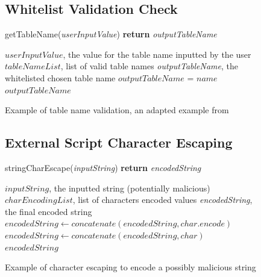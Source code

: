 \documentclass{ueacmpstyle}
\begin{document}
          \begin{figure}[ht]
            \subsection{Whitelist Validation Check}
            \label{sec:whitelist-valid}
            \centering
            \begin{algorithm}[H]
            \caption{getTableName(\emph{userInputValue}) {\bf return} \emph{outputTableName}}
              \begin{algorithmic}[1]
                \Require $userInputValue$, the value for the table name inputted by the user
                \Require $tableNameList$, list of valid table names
                \Ensure \emph{outputTableName}, the whitelisted chosen table name
                    \State $outputTableName$ = $name$
                  \EndIf
                \EndFor
                \State \Return $outputTableName$
              \end{algorithmic}
            \end{algorithm}
            \caption{Example of table name validation, an adapted example from 
                     \cite{OWASPSqlInjectionPrevention}}
            \label{fig:whitelist-valid}
          \end{figure}

          \begin{figure}[ht]
            \subsection{External Script Character Escaping}
            \label{sec:xss-char-esc}
            \centering
            \begin{algorithm}[H]
            \caption{stringCharEscape(\emph{inputString}) {\bf return} \emph{encodedString}}
              \begin{algorithmic}[1]
                \Require $inputString$, the inputted string (potentially malicious)
                \Require $charEncodingList$, list of characters encoded values
                \Ensure \emph{encodedString}, the final encoded string
                    \State $encodedString \leftarrow concatenate(encodedString, char.encode)$
                  \Else
                    \State $encodedString \leftarrow concatenate(encodedString, char)$
                  \EndIf
                \EndFor
                \State \Return $encodedString$
              \end{algorithmic}
            \end{algorithm}
            \caption{Example of character escaping to encode a possibly malicious string}
            \label{fig:xss-char-esc}
          \end{figure}
\end{document}
